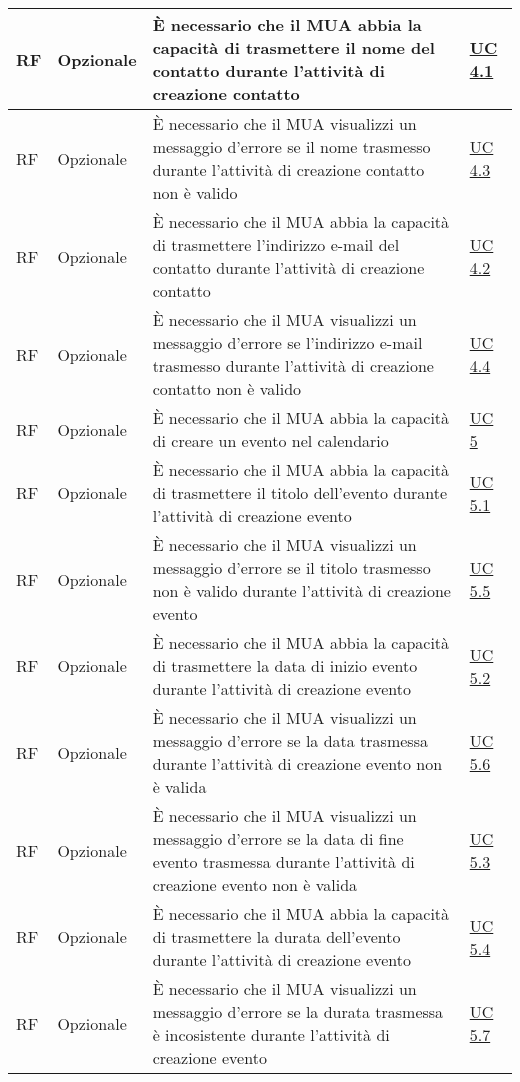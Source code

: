 \begin{longtable}{*{1}{>{\centering\arraybackslash}p{1.5cm}}*{1}{>{\centering\arraybackslash}p{2.5cm}}p{6cm}*{1}{>{\centering\arraybackslash}p{3cm}}}
    \\\hline
    RF & Opzionale & È necessario che il MUA abbia la capacità di trasmettere il nome del contatto durante l'attività di creazione contatto & \hyperref[sec:UC4.1]{UC 4.1}
    \\\hline
    RF & Opzionale & È necessario che il MUA visualizzi un messaggio d'errore se il nome trasmesso durante l'attività di creazione contatto non è valido & \hyperref[sec:UC4.3]{UC 4.3}
    \\\hline
    RF & Opzionale & È necessario che il MUA abbia la capacità di trasmettere l'indirizzo e-mail del contatto durante l'attività di creazione contatto & \hyperref[sec:UC4.2]{UC 4.2}
    \\\hline
    RF & Opzionale & È necessario che il MUA visualizzi un messaggio d'errore se l'indirizzo e-mail trasmesso durante l'attività di creazione contatto non è valido & \hyperref[sec:UC4.4]{UC 4.4}
    \\\hline
    RF & Opzionale & È necessario che il MUA abbia la capacità di creare un evento nel calendario & \hyperref[sec:UC5]{UC 5}
    \\\hline
    RF & Opzionale & È necessario che il MUA abbia la capacità di trasmettere il titolo dell'evento durante l'attività di creazione evento & \hyperref[sec:UC5.1]{UC 5.1}
    \\\hline
    RF & Opzionale & È necessario che il MUA visualizzi un messaggio d'errore se il titolo trasmesso non è valido durante l'attività di creazione evento & \hyperref[sec:UC5.5]{UC 5.5}
    \\\hline
    RF & Opzionale & È necessario che il MUA abbia la capacità di trasmettere la data di inizio evento durante l'attività di creazione evento & \hyperref[sec:UC5.2]{UC 5.2}
    \\\hline
    RF & Opzionale & È necessario che il MUA visualizzi un messaggio d'errore se la data trasmessa durante l'attività di creazione evento non è valida & \hyperref[sec:UC5.6]{UC 5.6}
    \\\hline
    RF & Opzionale & È necessario che il MUA visualizzi un messaggio d'errore se la data di fine evento trasmessa durante l'attività di creazione evento non è valida & \hyperref[sec:UC5.3]{UC 5.3}
    \\\hline
    RF & Opzionale & È necessario che il MUA abbia la capacità di trasmettere la durata dell'evento durante l'attività di creazione evento & \hyperref[sec:UC5.4]{UC 5.4}
    \\\hline
    RF & Opzionale & È necessario che il MUA visualizzi un messaggio d'errore se la durata trasmessa è incosistente durante l'attività di creazione evento & \hyperref[sec:UC5.7]{UC 5.7}

\end{longtable}
